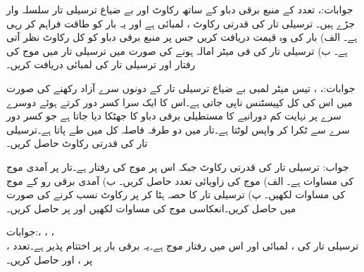 جوابات:، 
تعدد  کے منبع برقی دباو کے ساتھ رکاوٹ  اور بے ضیاع ترسیلی تار سلسلہ وار جڑے ہیں۔ ترسیلی تار کی قدرتی رکاوٹ ، لمبائی  ہے اور یہ بار  کو طاقت فراہم کر رہی ہے۔ الف) بار کی وہ قیمت دریافت کریں جس پر منبع برقی دباو کو کل  رکاوٹ نظر آتی ہے۔ ب) ترسیلی تار کی فی میٹر امالہ  ہونے کی صورت میں ترسیلی تار میں موج کی رفتار اور ترسیلی تار کی لمبائی دریافت کریں۔ 

جوابات:، ، 
تیس میٹر لمبی بے ضیاع ترسیلی تار کے دونوں سرے آزاد رکھنے کی صورت میں اس کی کل کپیسٹنس  ناپی جاتی ہے۔اس کا ایک سرا کسر دور کرتے ہوئے دوسرے سرے پر نہایت کم دورانیے کا مستطیلی برقی دباو کا جھٹکا دیا جاتا ہے جو کسر دور سرے سے ٹکرا کر واپس لوٹتا ہے۔تار میں دو طرفہ فاصلہ کل  میں طے پاتا ہے۔ترسیلی تار کی قدرتی رکاوٹ حاصل کریں۔

جواب:  
ترسیلی تار کی قدرتی رکاوٹ  جبکہ اس پر موج کی رفتار  ہے۔تار پر آمدی موج کی مساوات   ہے۔ الف) موج کی زاویائی تعدد حاصل کریں۔ ب) آمدی برقی رو کے موج کی مساوات لکھیں۔ پ) ترسیلی تار کا  حصہ ہٹا کر  پر  رکاوٹ نسب کرنے کی صورت میں  حاصل کریں۔انعکاسی موج  کی مساوات لکھیں اور  پر  حاصل کریں۔

جوابات:، ،
 ، \\
، 
ترسیلی تار کی ، لمبائی  اور اس میں رفتار موج  ہے۔یہ  برقی بار پر اختتام پذیر ہے۔تعدد  پر  ،  اور  حاصل کریں۔

